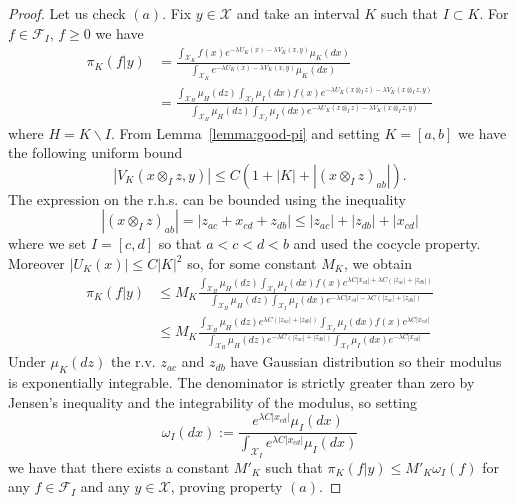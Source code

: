\documentclass[a4paper,12pt,reqno]{amsart}
\newcommand{\X}{\mathcal{X}}
\newcommand{\F}{\mathcal{F}}
\begin{document}
\begin{proof}
Let us check $(a)$.
Fix $y \in \X$ and take an interval $K$ such that $I \subset K$. For $f \in \mathcal{F}_I$, $f \ge 0$ we have
\begin{equation}
  \begin{split}
\pi_K(f|y) & = \frac{\int_{\X_K} f(x ) e^{-\lambda U_K(x)
    -\lambda V_K(x,y)} \mu_K(dx)}{\int_{\X_K}  e^{-\lambda U_K(x)
    -\lambda V_K(x,y)} \mu_K(dx)}
\\  & = \frac{\int_{\X_H} \mu_H(dz) \int_{\X_I} \mu_I(dx) f(x) e^{-\lambda U_K(x \otimes_I z)
    -\lambda V_K(x \otimes_I z,  y)}}{\int_{\X_H} \mu_H(dz) \int_{\X_I} \mu_I(dx) e^{-\lambda U_K(x \otimes_I z)
    -\lambda V_K(x \otimes_I z,   y)}}   
  \end{split}
\end{equation}
where $H = K \backslash I$.
From Lemma~\ref{lemma:good-pi} and setting $K = [a,b]$ we have the following uniform bound
\begin{equation}
|V_K(x \otimes_I z,y)| \le C  (1+|K|+|(x \otimes_I z)_{ab}|).
\end{equation}
The expression on the r.h.s. can be bounded using the inequality
$$
|(x \otimes_I z)_{ab}| = |z_{ac}+x_{cd}+z_{db}| \le |z_{ac}| + |z_{db}| + |x_{cd}|
$$ 
where we set $I = [c,d]$ so that $a < c < d < b$ and used the cocycle property.
Moreover $|U_K(x)| \le C |K|^2$
so, for some constant $M_K$, we obtain
\begin{equation*}
  \begin{split}
\pi_K(f|y) & \le M_K \frac{\int_{\X_H} \mu_H(dz) \int_{\X_I} \mu_I(dx) f(x) e^{\lambda C|x_{cd}| + \lambda C (|z_{ac}|+|z_{db}|)}}{\int_{\X_H} \mu_H(dz) \int_{\X_I} \mu_I(dx) e^{-\lambda C|x_{cd}| - \lambda C (|z_{ac}|+|z_{db}|)}} 
\\ & \le M_K \frac{\int_{\X_H} \mu_H(dz) e^{\lambda C (|z_{ac}|+|z_{db}|)} \int_{\X_I} \mu_I(dx) f(x) e^{\lambda C|x_{cd}|}}{\int_{\X_H} \mu_H(dz) e^{- \lambda C (|z_{ac}|+|z_{db}|)} \int_{\X_I} \mu_I(dx) e^{-\lambda C|x_{cd}|}}     
  \end{split}
\end{equation*}
Under $\mu_K(dz)$ the r.v. $z_{ac}$ and $z_{db}$ have Gaussian distribution so their modulus is exponentially integrable. The denominator is strictly greater than zero by Jensen's inequality and the integrability of the modulus, so setting
\begin{equation}
  \label{eq:omega}
\omega_I(dx) := \frac{e^{\lambda C|x_{cd}|} \mu_I(dx)}{\int_{\X_I} e^{\lambda C|x_{cd}|} \mu_I(dx)} \end{equation}
we have that there exists a constant $M'_K$ such that $\pi_K(f|y) \le M'_K \omega_I(f)$ for any $f \in \F_I$ and any $y \in \X$, proving property $(a)$. 


\end{proof}
\end{document}
